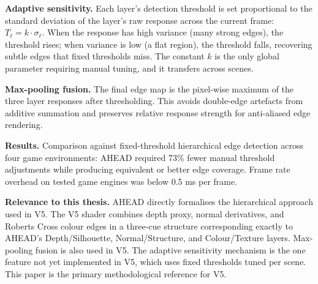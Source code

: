 \documentclass[11pt, a4paper]{article}
\begin{document}
\textbf{Adaptive sensitivity.} Each layer's detection threshold is set proportional to the standard deviation of the layer's raw response across the current frame: $T_\ell = k \cdot \sigma_\ell$. When the response has high variance (many strong edges), the threshold rises; when variance is low (a flat region), the threshold falls, recovering subtle edges that fixed thresholds miss. The constant $k$ is the only global parameter requiring manual tuning, and it transfers across scenes.

\textbf{Max-pooling fusion.} The final edge map is the pixel-wise maximum of the three layer responses after thresholding. This avoids double-edge artefacts from additive summation and preserves relative response strength for anti-aliased edge rendering.

\textbf{Results.} Comparison against fixed-threshold hierarchical edge detection across four game environments: AHEAD required 73\% fewer manual threshold adjustments while producing equivalent or better edge coverage. Frame rate overhead on tested game engines was below 0.5 ms per frame.

\textbf{Relevance to this thesis.} AHEAD directly formalises the hierarchical approach used in V5. The V5 shader combines depth proxy, normal derivatives, and Roberts Cross colour edges in a three-cue structure corresponding exactly to AHEAD's Depth/Silhouette, Normal/Structure, and Colour/Texture layers. Max-pooling fusion is also used in V5. The adaptive sensitivity mechanism is the one feature not yet implemented in V5, which uses fixed thresholds tuned per scene. This paper is the primary methodological reference for V5.
\end{document}
